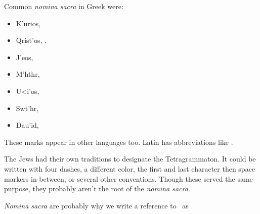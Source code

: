 \documentclass[aspectratio=169]{beamer}
\begin{document}
\begin{frame}
  Common \emph{nomina sacra} in Greek were:\pause {}
  \begin{itemize}
	\item K'urios, \pause{}
	\item Qrist'os, , \pause
	\item J'eos, \pause{}
	\item M'hthr, \pause
	\item U<i'os, \pause{}
	  \item Swt'hr, \pause
	\item Dau'id, 
  \end{itemize}
\end{frame}

\begin{frame}
  These marks appear in other languages too.
  Latin has abbreviations like .
\end{frame}

\begin{frame}
  The Jews had their own traditions to designate the Tetragrammaton.
  It could be written with four dashes, a different color, the first and last character then space markers in between, or several other conventions.
  Though these served the same purpose, they probably aren't the root of the \emph{nomina sacra}.
\end{frame}

\begin{frame}
  \emph{Nomina sacra} are probably why we write a reference to \yhwh\ as \lord .
\end{frame}
\end{document}
